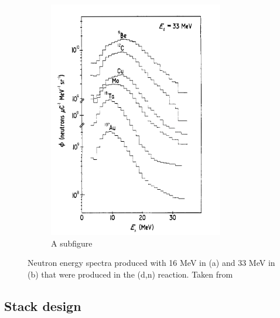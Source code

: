 \documentclass[twoside,english]{uiofysmaster/uiofysmaster}
\begin{document}
\begin{figure} [h!]
\begin{subfigure}{.5\textwidth}
	\end{subfigure}%
  \begin{subfigure}{.5\textwidth}
    \centering
  	\includegraphics[width=.95\linewidth]{meulders_33.png}
  		\caption{A subfigure}
  		\label{fig:energy_33}
	\end{subfigure}
 \caption{Neutron energy spectra produced with 16 MeV in (a) and 33 MeV in (b) that were produced in the (d,n) reaction. Taken from \citep{Meulders}}
 \label{fig:meulders_energydistribution}
\end{figure}
\noindent




\subsection{Stack design}
\label{sec: stack_design}
\end{document}

